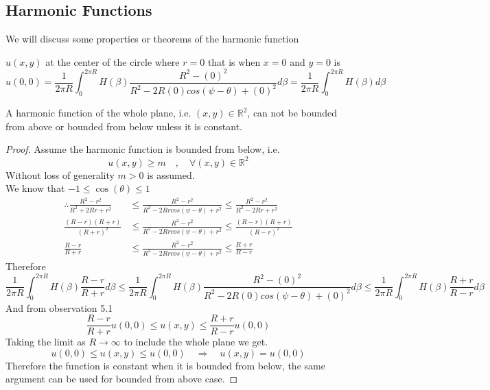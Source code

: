 \documentclass[]{article}
\begin{document}
\subsection{Harmonic Functions}
We will discuss some properties or theorems of the harmonic function
\begin{observation}
    $u(x,y)$ at the center of the circle where $r=0$ that is when $x=0$ and $y=0$ is
    \[
        u(0,0) = \frac{1}{2\pi R}\int_{0}^{2\pi R} H(\beta)\frac{R^2-(0)^2}{R^2-2R(0)cos(\psi  -\theta)+(0)^2}d\beta =\frac{1}{2\pi R}\int_{0}^{2\pi R} H(\beta)d\beta     
    \]
\end{observation}    
\begin{theorem}
    A harmonic function of the whole plane, i.e. $(x,y) \in \mathbb{R}^2$, can not be bounded from above or bounded from below unless it is constant.    
\end{theorem}
\begin{proof}
    Assume the harmonic function is bounded from below, i.e.    
    \[
        u(x,y) \geq m \quad,\quad \forall (x,y) \in \mathbb{R}^2     
    \]
    Without loss of generality $m > 0$ is assumed.
    \\
    We know that $ -1 \leq \cos(\theta) \leq 1$
    \begin{align*}
        \therefore
        \frac{R^2-r^2}{R^2+2Rr+r^2} &\leq \frac{R^2-r^2}{R^2-2Rrcos(\psi  -\theta)+r^2} \leq \frac{R^2-r^2}{R^2-2Rr+r^2}
        \\
        \frac{(R-r)(R+r)}{{(R+r)}^2} &\leq \frac{R^2-r^2}{R^2-2Rrcos(\psi  -\theta)+r^2} \leq \frac{(R-r)(R+r)}{{(R-r)}^2}
        \\
        \frac{R-r}{R+r} &\leq \frac{R^2-r^2}{R^2-2Rrcos(\psi  -\theta)+r^2} \leq \frac{R+r}{R-r}
    \end{align*}
    Therefore
    \[
        \frac{1}{2\pi R}\int_{0}^{2\pi R} H(\beta)\frac{R-r}{R+r} d\beta \leq \frac{1}{2\pi R}\int_{0}^{2\pi R} H(\beta)\frac{R^2-(0)^2}{R^2-2R(0)cos(\psi  -\theta)+(0)^2}d\beta \leq \frac{1}{2\pi R}\int_{0}^{2\pi R} H(\beta)\frac{R+r}{R-r} d\beta    
    \]
    And from observation 5.1 
    \[
        \frac{R-r}{R+r} u(0,0) \leq u(x,y) \leq \frac{R+r}{R-r} u(0,0)    
    \]
    Taking the limit as $R \to \infty$ to include the whole plane we get.
    \[
        u(0,0) \leq u(x,y) \leq u(0,0) \quad \Rightarrow \quad u(x,y) = u(0,0)    
    \]
    Therefore the function is constant when it is bounded from below, the same argument can be used for bounded from above case.
\end{proof}
\end{document}
